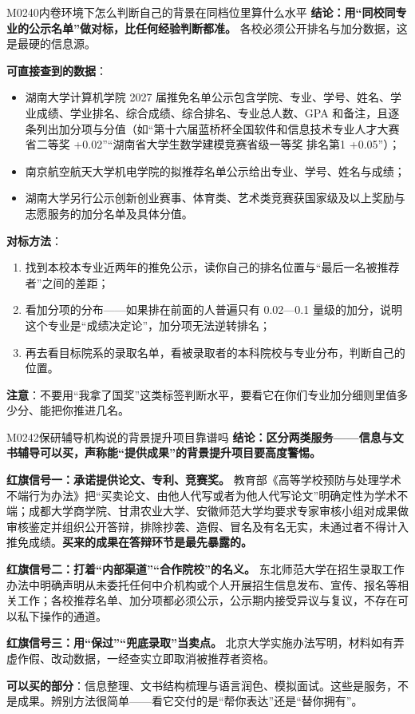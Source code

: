 \begin{qa}{M0240}{内卷环境下怎么判断自己的背景在同档位里算什么水平}
\textbf{结论：用“同校同专业的公示名单”做对标，比任何经验判断都准。} 各校必须公开排名与加分数据，这是最硬的信息源。

\textbf{可直接查到的数据}：
\begin{itemize}
  \item 湖南大学计算机学院 2027 届推免名单公示包含学院、专业、学号、姓名、学业成绩、学业排名、综合成绩、综合排名、专业总人数、GPA 和备注，且逐条列出加分项与分值（如“第十六届蓝桥杯全国软件和信息技术专业人才大赛 省二等奖 +0.02”“湖南省大学生数学建模竞赛省级一等奖 排名第1 +0.05”）；
  \item 南京航空航天大学机电学院的拟推荐名单公示给出专业、学号、姓名与成绩；
  \item 湖南大学另行公示创新创业赛事、体育类、艺术类竞赛获国家级及以上奖励与志愿服务的加分名单及具体分值。
\end{itemize}

\textbf{对标方法}：
\begin{enumerate}
  \item 找到本校本专业近两年的推免公示，读你自己的排名位置与“最后一名被推荐者”之间的差距；
  \item 看加分项的分布——如果排在前面的人普遍只有 0.02—0.1 量级的加分，说明这个专业是“成绩决定论”，加分项无法逆转排名；
  \item 再去看目标院系的录取名单，看被录取者的本科院校与专业分布，判断自己的位置。
\end{enumerate}

\textbf{注意}：不要用“我拿了国奖”这类标签判断水平，要看它在你们专业加分细则里值多少分、能把你推进几名。
\end{qa}

\begin{qa}{M0242}{保研辅导机构说的背景提升项目靠谱吗}
\textbf{结论：区分两类服务——信息与文书辅导可以买，声称能“提供成果”的背景提升项目要高度警惕。}

\textbf{红旗信号一：承诺提供论文、专利、竞赛奖。} 教育部《高等学校预防与处理学术不端行为办法》把“买卖论文、由他人代写或者为他人代写论文”明确定性为学术不端；成都大学商学院、甘肃农业大学、安徽师范大学均要求专家审核小组对成果做审核鉴定并组织公开答辩，排除抄袭、造假、冒名及有名无实，未通过者不得计入推免成绩。\textbf{买来的成果在答辩环节是最先暴露的。}

\textbf{红旗信号二：打着“内部渠道”“合作院校”的名义。} 东北师范大学在招生录取工作办法中明确声明从未委托任何中介机构或个人开展招生信息发布、宣传、报名等相关工作；各校推荐名单、加分项都必须公示，公示期内接受异议与复议，不存在可以私下操作的通道。

\textbf{红旗信号三：用“保过”“兜底录取”当卖点。} 北京大学实施办法写明，材料如有弄虚作假、改动数据，一经查实立即取消被推荐者资格。

\textbf{可以买的部分}：信息整理、文书结构梳理与语言润色、模拟面试。这些是服务，不是成果。辨别方法很简单——看它交付的是“帮你表达”还是“替你拥有”。
\end{qa}

